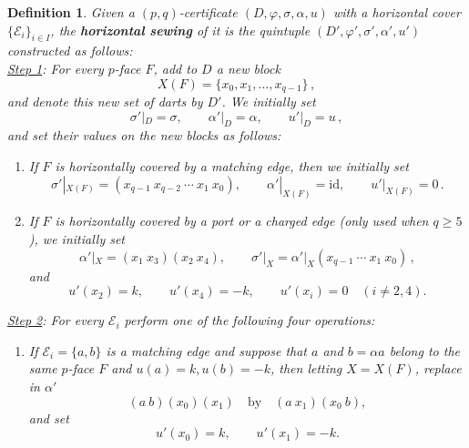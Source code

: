 \documentclass[11pt]{article}
\newtheorem{definition}[theorem]{Definition}
\theoremstyle{remark}
\newcommand{\cE}{\mathcal E}
\newcommand{\id}{\mathrm{id}}
\begin{document}
\begin{definition}\label{def:HSewing} Given a $(p,q)$-certificate $(D,\varphi,\sigma,\alpha,u)$ with a
horizontal cover $\{\cE_i\}_{i\in I}$, the {\bf horizontal sewing} of it is the quintuple $(D',\varphi', \sigma',\alpha', u')$ constructed as follows: \\

\noindent \underline{Step 1}:
For every $p$-face $F$, add to $D$ a new block
\[
        X(F)=\{x_0,x_1,\ldots,x_{q-1}\} \, ,
\]
and denote this new set of darts by $D'$. We initially set 
\[
        \sigma'|_D=\sigma,\qquad \alpha'|_D=\alpha,\qquad u'|_D=u \, ,
\]
and set their values on the new blocks as follows:
\begin{enumerate}
    \item If $F$ is horizontally covered by a matching edge, then we initially set   
\[
        \sigma'|_{X(F)}=(x_{q-1}\ x_{q-2}\   \cdots\ x_{1}\ x_0),\qquad \alpha'|_{X(F)}=\id,
        \qquad u'|_{X(F)}=0 \, .
\]

\item If $F$ is horizontally covered by a port or a charged edge (only used when $q \geq 5$), we initially set 
\[
        \alpha'|_X=(x_1\ x_3)(x_2\ x_4),
        \qquad \sigma'|_X=\alpha'|_X (x_{q-1}\  \cdots\ x_{1}\ x_0) \, ,
\]
and 
\[
        u'(x_2)=k,\qquad u'(x_4)=-k,
        \qquad u'(x_i)=0\quad(i\ne2,4).
\]
\end{enumerate}





\medskip
\noindent \underline{Step 2}: For every $\cE_i$ %
perform one of the following
four operations: %

\begin{enumerate}%
\item[(H1a)] If $\cE_i=\{a,b\}$ is a matching edge and suppose
that $a$ and $b=\alpha a$ belong to the same $p$-face $F$ and $u(a)=k, u(b)=-k$, then letting $X=X(F)$, replace in
$\alpha'$
\[
        (a\ b)(x_0)(x_1)
        \quad\text{by}\quad
        (a\ x_1)(x_0\ b),
\]
and set
\[
        u'(x_0)=k,\qquad u'(x_1)=-k.
\]



\end{enumerate}
\end{definition}
\end{document}
